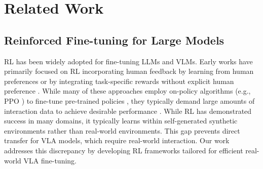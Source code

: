 \section{Related Work}
\subsection{Reinforced Fine-tuning for Large Models}

RL has been widely adopted for fine-tuning LLMs and VLMs. Early works have primarily focused on RL incorporating human feedback \cite{christiano2017deep, ouyang2022training, luong2024reft, casper2023open, zhai2024fine} by learning from human preferences or by integrating task-specific rewards without explicit human preference \cite{ramamurthy2022reinforcement, bai2024digirl, carta2023grounding, kimin2021pebbla}. While many of these approaches employ on-policy algorithms (e.g., PPO \cite{schulman2017proximal}) to fine-tune pre-trained policies \cite{bai2024digirl, gupta2019relay, shao2024deepseekmath}, they typically demand large amounts of interaction data to achieve desirable performance \cite{ball2023efficient, li2024selu}. While RL has demonstrated success in many domains, it typically learns within self-generated synthetic environments rather than real-world environments. This gap prevents direct transfer for VLA models, which require real-world interaction. Our work addresses this discrepancy by developing RL frameworks tailored for efficient real-world VLA fine-tuning.

